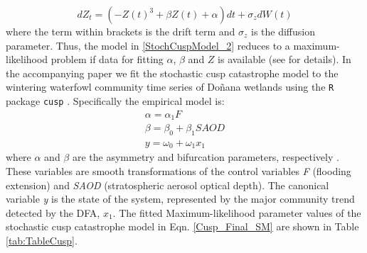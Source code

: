 \documentclass[11pt]{article}
\begin{document}
\begin{equation}\label{StochCuspModel_2}
	dZ_{t} = (-Z(t)^3 + \beta Z(t) + \alpha)dt + \sigma_{z} dW(t)
\end{equation}
where the term within brackets is the drift term and $ \sigma_{z} $ is the diffusion parameter. Thus, the model in \ref{StochCuspModel_2} reduces to a maximum-likelihood problem if data for fitting $ \alpha $, $ \beta $ and $ Z $ is available (see \cite{Cobb1985,Grasman2009} for details). In the accompanying paper we fit the stochastic cusp catastrophe model to the wintering waterfowl community time series of Doñana wetlands using the \verb|R| package \verb|cusp| \cite{Grasman2009}. Specifically the empirical model is: \\

\begin{equation}\label{Cusp_Final_SM}
	\begin{aligned}
		\alpha = \alpha_{1}F \\
		\beta = \beta_{0} + \beta_{1}SAOD \\
		y = \omega_{0} + \omega_{1}x_{1}
	\end{aligned}
\end{equation}
where $\alpha$ and $\beta$ are the asymmetry and bifurcation parameters, respectively \cite{Grasman2009}. These variables are smooth transformations of the control variables \textit{F} (flooding extension) and \textit{SAOD} (stratospheric aerosol optical depth). The canonical variable \textit{y} is the state of the system, represented by the major community trend detected by the DFA, $x_{1}$. The fitted Maximum-likelihood parameter values of the stochastic cusp catastrophe model in Eqn. \ref{Cusp_Final_SM} are shown in Table \ref{tab:TableCusp}.

{}
\printbibliography

%
\end{document}
